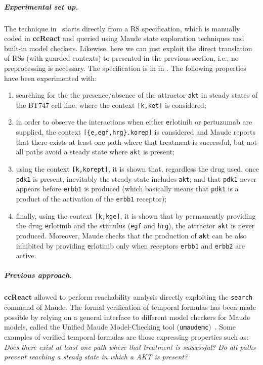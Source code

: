 \subparagraph*{Experimental set up.}
The technique in~\cite{DBLP:conf/cmsb/BallisBFO24} starts directly from a RS specification, which is manually coded in \textbf{ccReact} and queried using Maude state exploration techniques and built-in model checkers. Likewise, here we can just exploit the direct translation of RSs (with guarded contexts) to \GROOVE presented in the previous section, i.e., no preprocessing is necessary. The \BioResolve specification is in  in .
The following properties have been experimented with:
\begin{enumerate}
\item searching for the the presence/absence of the attractor \texttt{akt} in steady states of the BT747 cell line, where the context \verb=[k,ket]= is considered;

\item in order to observe the interactions when either \texttt{e}rlotinib or \texttt{p}ertuzumab are supplied, the context \verb=[{e,egf,hrg}.korep]= is considered and Maude reports that there exists at least one path where that treatment is successful, but not all paths avoid a steady state where \texttt{akt} is present;

\item using the context \verb=[k,korept]=, it is shown that, regardless the drug used, once \texttt{pdk1} is present, inevitably the steady state includes \texttt{akt}; and that \texttt{pdk1} never appears before \texttt{erbb1} is produced (which basically means that \texttt{pdk1} is a product of the activation of the \texttt{erbb1} receptor);

\item finally, using the context \verb=[k,kge]=, it is shown that by permanently providing the drug \texttt{e}rlotinib and the stimulus (\texttt{egf} and \texttt{hrg}), the attractor \texttt{akt} is never produced. Moreover, Maude checks that the production of \texttt{akt} can be also inhibited by providing \texttt{e}rlotinib only when receptors \texttt{erbb1} and \texttt{erbb2} are active.
\end{enumerate}

\subparagraph*{Previous approach.}
\textbf{ccReact} allowed to perform reachability analysis directly exploiting the \texttt{search} command of Maude. 
The formal verification of temporal formulas has been made possible by relying on a general interface to different model checkers for Maude models, called the Unified Maude Model-Checking tool (\texttt{umaudemc})~\cite{DBLP:journals/jlap/RubioMPV21}.
Some examples of verified temporal formulas are those expressing properties such as:
\emph{Does there exist at least one path where that treatment is successful?}
\emph{Do all paths prevent reaching a steady state in which a AKT is present?}

